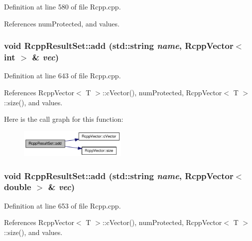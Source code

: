 Definition at line 580 of file Rcpp.cpp.

References numProtected, and values.\hypertarget{classRcppResultSet_068cb13e27c0e26dd05e92d67eaeb7d0}{
\subsubsection[add]{\setlength{\rightskip}{0pt plus 5cm}void RcppResultSet::add (std::string {\em name}, \/  {\bf RcppVector}$<$ int $>$ \& {\em vec})}}
\label{classRcppResultSet_068cb13e27c0e26dd05e92d67eaeb7d0}




Definition at line 643 of file Rcpp.cpp.

References RcppVector$<$ T $>$::cVector(), numProtected, RcppVector$<$ T $>$::size(), and values.

Here is the call graph for this function:\nopagebreak
\begin{figure}[H]
\begin{center}
\leavevmode
\includegraphics[width=146pt]{classRcppResultSet_068cb13e27c0e26dd05e92d67eaeb7d0_cgraph}
\end{center}
\end{figure}
\hypertarget{classRcppResultSet_10a64eb042cd3bac5b635670ae2fff5d}{
\subsubsection[add]{\setlength{\rightskip}{0pt plus 5cm}void RcppResultSet::add (std::string {\em name}, \/  {\bf RcppVector}$<$ double $>$ \& {\em vec})}}
\label{classRcppResultSet_10a64eb042cd3bac5b635670ae2fff5d}




Definition at line 653 of file Rcpp.cpp.

References RcppVector$<$ T $>$::cVector(), numProtected, RcppVector$<$ T $>$::size(), and values.

